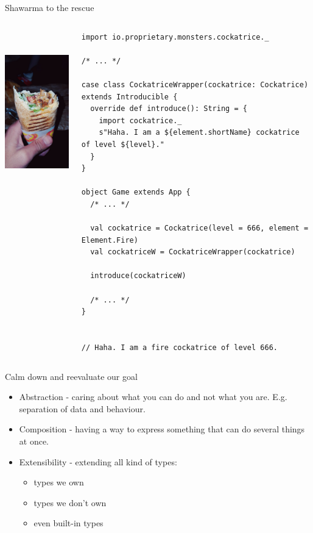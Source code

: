 \documentclass[presentation,aspectratio=169,smaller]{beamer}
\begin{document}
\begin{frame}[label={sec:orgf1f533d},fragile]{Shawarma to the rescue}
 \begin{columns}
\begin{column}{0.25\columnwidth}
\begin{center}
\includegraphics[height=7cm]{images/shawarma.jpg}
\end{center}
\end{column}

\begin{column}{0.75\columnwidth}
\begin{verbatim}
import io.proprietary.monsters.cockatrice._

/* ... */

case class CockatriceWrapper(cockatrice: Cockatrice) extends Introducible {
  override def introduce(): String = {
    import cockatrice._
    s"Haha. I am a ${element.shortName} cockatrice of level ${level}."
  }
}

object Game extends App {
  /* ... */

  val cockatrice = Cockatrice(level = 666, element = Element.Fire)
  val cockatriceW = CockatriceWrapper(cockatrice)

  introduce(cockatriceW)

  /* ... */
}


// Haha. I am a fire cockatrice of level 666.
\end{verbatim}
\end{column}
\end{columns}
\end{frame}

\begin{frame}[label={sec:orga7b59e5}]{Calm down and reevaluate our goal}
\begin{itemize}
\item <1-> Abstraction - caring about what you can do and not what you are. E.g.
separation of data and behaviour.
\item <2-> Composition - having a way to express something that can do several things at
once.
\item <3-> Extensibility - extending all kind of types:
\begin{itemize}
\item types we own
\item types we don't own
\item even built-in types
\end{itemize}
\end{itemize}
\end{frame}
\end{document}
